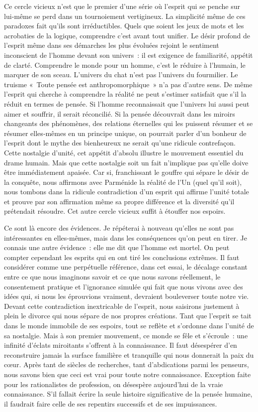 \documentclass{book}
\begin{document}
Ce cercle vicieux n'est que le premier d'une série où l'esprit qui se penche sur lui‑même se perd dans un tournoiement vertigineux. La simplicité même de ces paradoxes fait qu'ils sont irréductibles. Quels que soient les jeux de mots et les acrobaties de la logique, comprendre c'est avant tout unifier. Le désir profond de l'esprit même dans ses démarches les plus évoluées rejoint le sentiment inconscient de l'homme devant son univers : il est exigence de familiarité, appétit de clarté. Comprendre le monde pour un homme, c'est le réduire à l'humain, le marquer de son sceau. L'univers du chat n'est pas l'univers du fourmilier. Le truisme « Toute pensée est anthropomorphique » n'a pas d'autre sens. De même l'esprit qui cherche à comprendre la réalité ne peut s'estimer satisfait que s'il la réduit en termes de pensée. Si l'homme reconnaissait que l'univers lui aussi peut aimer et souffrir, il serait réconcilié. Si la pensée découvrait dans les miroirs changeants des phénomènes, des relations éternelles qui les puissent résumer et se résumer elles‑mêmes en un principe unique, on pourrait parler d'un bonheur de l'esprit dont le mythe des bienheureux ne serait qu'une ridicule contrefaçon. Cette nostalgie d'unité, cet appétit d'absolu illustre le mouvement essentiel du drame humain. Mais que cette nostalgie soit un fait n'implique pas qu'elle doive être immédiatement apaisée. Car si, franchissant le gouffre qui sépare le désir de la conquête, nous affirmons avec Parménide la réalité de l'Un (quel qu'il soit), nous tombons dans la ridicule contradiction d'un esprit qui affirme l'unité totale et prouve par son affirmation même sa propre différence et la diversité qu'il prétendait résoudre. Cet autre cercle vicieux suffit à étouffer nos espoirs.

Ce sont là encore des évidences. Je répéterai à nouveau qu'elles ne sont pas intéressantes en elles‑mêmes, mais dans les conséquences qu'on peut en tirer. Je connais une autre évidence : elle me dit que l'homme est mortel. On peut compter cependant les esprits qui en ont tiré les conclusions extrêmes. Il faut considérer comme une perpétuelle référence, dans cet essai, le décalage constant entre ce que nous imaginons savoir et ce que nous savons réellement, le consentement pratique et l'ignorance simulée qui fait que nous vivons avec des idées qui, si nous les éprouvions vraiment, devraient bouleverser toute notre vie. Devant cette contradiction inextricable de l'esprit, nous saisirons justement à plein le divorce qui nous sépare de nos propres créations. Tant que l'esprit se tait dans le monde immobile de ses espoirs, tout se reflète et s'ordonne dans l'unité de sa nostalgie. Mais à son premier mouvement, ce monde se fêle et s'écroule : une infinité d'éclats miroitants s'offrent à la connaissance. Il faut désespérer d'en reconstruire jamais la surface familière et tranquille qui nous donnerait la paix du cœur. Après tant de siècles de recherches, tant d'abdications parmi les penseurs, nous savons bien que ceci est vrai pour toute notre connaissance. Exception faite pour les rationalistes de profession, on désespère aujourd'hui de la vraie connaissance. S'il fallait écrire la seule histoire significative de la pensée humaine, il faudrait faire celle de ses repentirs successifs et de ses impuissances.
\end{document}
